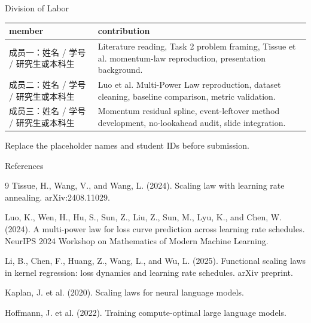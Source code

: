 \documentclass[fontset=fandol,aspectratio=169,10pt]{ctexbeamer}
\newcommand{\MemberA}{成员一：姓名 / 学号 / 研究生或本科生}
\newcommand{\MemberB}{成员二：姓名 / 学号 / 研究生或本科生}
\newcommand{\MemberC}{成员三：姓名 / 学号 / 研究生或本科生}
\newcommand{\smallnote}[1]{{\scriptsize\color{tdltGray}#1}}
\begin{document}
\begin{frame}{Division of Labor}
  \begin{table}
    \centering
    \small
    \begin{tabularx}{0.96\textwidth}{lX}
      \toprule
      member & contribution\\
      \midrule
      \MemberA & Literature reading, Task 2 problem framing, Tissue et al. momentum-law reproduction, presentation background.\\
      \MemberB & Luo et al. Multi-Power Law reproduction, dataset cleaning, baseline comparison, metric validation.\\
      \MemberC & Momentum residual spline, event-leftover method development, no-lookahead audit, slide integration.\\
      \bottomrule
    \end{tabularx}
  \end{table}
  \vspace{0.5em}
  \smallnote{Replace the placeholder names and student IDs before submission.}
\end{frame}

\begin{frame}{References}
  \scriptsize
  \begin{thebibliography}{9}
    Tissue, H., Wang, V., and Wang, L. (2024).
    \newblock Scaling law with learning rate annealing.
    \newblock arXiv:2408.11029.

    Luo, K., Wen, H., Hu, S., Sun, Z., Liu, Z., Sun, M., Lyu, K., and Chen, W. (2024).
    \newblock A multi-power law for loss curve prediction across learning rate schedules.
    \newblock NeurIPS 2024 Workshop on Mathematics of Modern Machine Learning.

    Li, B., Chen, F., Huang, Z., Wang, L., and Wu, L. (2025).
    \newblock Functional scaling laws in kernel regression: loss dynamics and learning rate schedules.
    \newblock arXiv preprint.

    Kaplan, J. et al. (2020).
    \newblock Scaling laws for neural language models.

    Hoffmann, J. et al. (2022).
    \newblock Training compute-optimal large language models.
  \end{thebibliography}
\end{frame}
\end{document}
